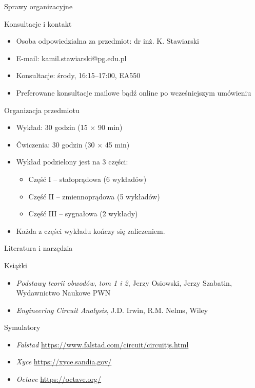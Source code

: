 
\begin{frame}{Sprawy organizacyjne}
	\begin{block}{Konsultacje i kontakt}
		\begin{itemize}
			\item[\bt] Osoba odpowiedzialna za przedmiot: dr inż. K. Stawiarski
			\item[\bt] E-mail: kamil.stawiarski@pg.edu.pl
			\item[\bt] Konsultacje: środy, 16:15–17:00, EA550
			\item[\bt] Preferowane konsultacje mailowe bądź online po wcześniejszym umówieniu
		\end{itemize}
	\end{block}
\end{frame}

\begin{frame}{Organizacja przedmiotu}
	\begin{itemize}
		\item[\bt] Wykład: 30 godzin (15 × 90 min)
		\item[\bt] Ćwiczenia: 30 godzin (30 × 45 min)
		\item[\bt] Wykład podzielony jest na 3 części:
		      \begin{itemize}
			      \item[\bt] Część I – stałoprądowa (6 wykładów)
			      \item[\bt] Część II – zmiennoprądowa (5 wykładów)
			      \item[\bt] Część III – sygnałowa (2 wykłady)
		      \end{itemize}
		\item[\bt] Każda z części wykładu kończy się zaliczeniem.
	\end{itemize}
\end{frame}

\begin{frame}{Literatura i narzędzia}
	\begin{block}{Książki}
		\begin{itemize}
			\item[\bt] \textit{Podstawy teorii obwodów, tom 1 i 2}, Jerzy Osiowski, Jerzy Szabatin, Wydawnictwo Naukowe PWN
			\item[\bt] \textit{Engineering Circuit Analysis}, J.D. Irwin, R.M. Nelms, Wiley
		\end{itemize}
	\end{block}
	\begin{block}{Symulatory}
		\begin{itemize}
			\item[\bt] \textit{Falstad} \url{https://www.falstad.com/circuit/circuitjs.html}
			\item[\bt] \textit{Xyce} \url{https://xyce.sandia.gov/}
			\item[\bt] \textit{Octave} \url{https://octave.org/}
		\end{itemize}
	\end{block}
\end{frame}

